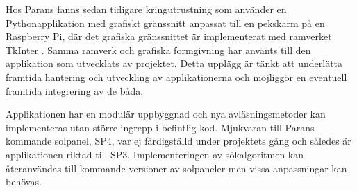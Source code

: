         Hos Parans fanns sedan tidigare kringutrustning som använder en Pythonapplikation med grafiskt gränssnitt anpassat till en pekskärm på en Raspberry Pi, där det grafiska gränssnittet är implementerat med ramverket TkInter \cite{solarremote}. Samma ramverk och grafiska formgivning har använts till den applikation som utvecklats av projektet. Detta upplägg är tänkt att underlätta framtida hantering och utveckling av applikationerna och möjliggör en eventuell framtida integrering av de båda. \bigskip

        Applikationen har en modulär uppbyggnad och nya avläsningsmetoder kan implementeras utan större ingrepp i befintlig kod. Mjukvaran till Parans kommande solpanel, SP4, var ej färdigställd under projektets gång och således är applikationen riktad till SP3. Implementeringen av sökalgoritmen kan återanvändas till kommande versioner av solpaneler men vissa anpassningar kan behövas.
